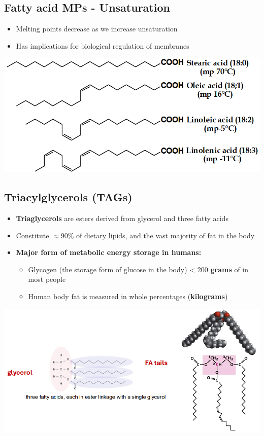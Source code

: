 \documentclass[10pt]{article}
\begin{document}
\subsection*{Fatty acid MPs - Unsaturation}
\begin{itemize}
    \item Melting points decrease as we increase unsaturation
    \item Has implications for biological regulation of membranes
\end{itemize}
\begin{center}
    \includegraphics*[scale=0.5]{L2_12.png}
\end{center}

\subsection*{Triacylglycerols (TAGs)}
\begin{itemize}
    \item \textbf{Triaglycerols} are esters derived from glycerol and three fatty acids
    \item Constitute $\approx 90\%$ of dietary lipids, and the vast majority of fat in the body
    \item \textbf{Major form of metabolic energy storage in humans:}
    \begin{itemize}
        \item Glycogen (the storage form of glucose in the body) < 200 \textbf{grams} of in most people 
        \item Human body fat is measured in whole percentages (\textbf{kilograms})
    \end{itemize}
\end{itemize}
\begin{center}
    \includegraphics*[scale=0.5]{L2_13.png}
\end{center}
\end{document}
